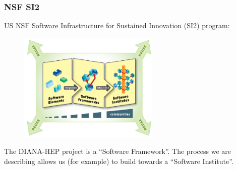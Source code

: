 \begin{frame}
\frametitle{NSF SI2}

US NSF Software Infrastructure for Sustained Innovation (SI2) program:
\begin{figure}[htbp]
\begin{center}
\includegraphics[width=0.6\textwidth]{images/nsf-si2-overview.jpg}
\label{fig:nsfsi2}
\end{center}
\end{figure}

The DIANA-HEP project is a ``Software Framework''. The process we are describing
allows us (for example) to build towards a ``Software Institute''.

\end{frame}



